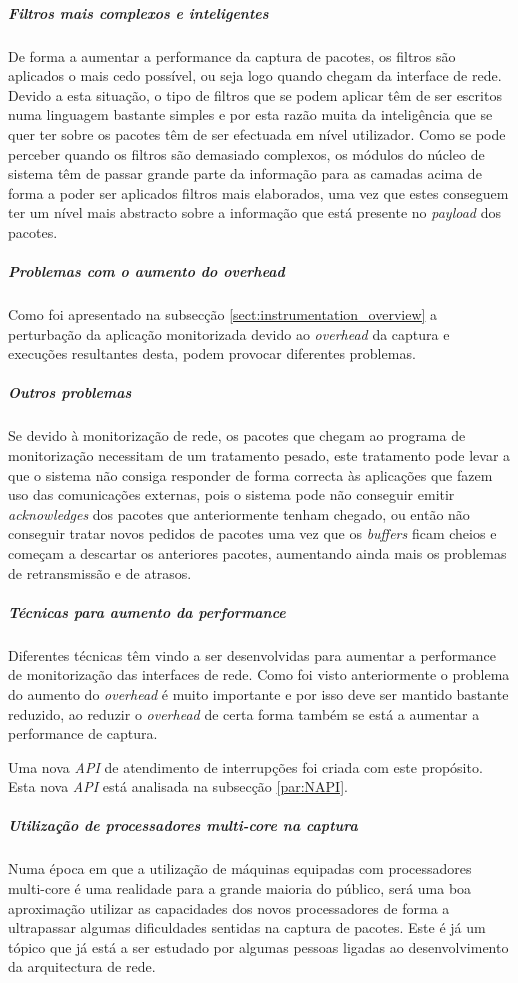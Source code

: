 \subparagraph*{Filtros mais complexos e inteligentes} De forma a aumentar a performance da captura de pacotes, os filtros são aplicados o mais cedo possível, ou seja logo quando chegam da interface de rede.
Devido a esta situação, o tipo de filtros que se podem aplicar têm de ser escritos numa linguagem bastante simples e por esta razão muita da inteligência que se quer ter sobre os pacotes têm de ser efectuada em nível utilizador.
Como se pode perceber quando os filtros são demasiado complexos, os módulos do núcleo de sistema têm de passar grande parte da informação para as camadas acima de forma a poder ser aplicados filtros mais elaborados, uma vez que estes conseguem ter um nível mais abstracto sobre a informação que está presente no \textit{payload} dos pacotes.

\subparagraph*{Problemas com o aumento do overhead}
Como foi apresentado na subsecção \ref{sect:instrumentation_overview} a perturbação da aplicação monitorizada devido ao \textit{overhead} da captura e execuções resultantes desta, podem provocar diferentes problemas.

\subparagraph*{Outros problemas
}
Se devido à monitorização de rede, os pacotes que chegam ao programa de monitorização necessitam de um tratamento pesado, este tratamento pode levar a que o sistema não consiga responder de forma correcta às aplicações que fazem uso das comunicações externas, pois o sistema pode não conseguir emitir \textit{acknowledges} dos pacotes que anteriormente tenham chegado, ou então não conseguir tratar novos pedidos de pacotes uma vez que os \textit{buffers} ficam cheios e começam a descartar os anteriores pacotes, aumentando ainda mais os problemas de retransmissão e de atrasos.

\subparagraph*{Técnicas para aumento da performance}
Diferentes técnicas têm vindo a ser desenvolvidas para aumentar a performance de monitorização das interfaces de rede.
Como foi visto anteriormente o problema do aumento do \textit{overhead} é muito importante e por isso deve ser mantido bastante reduzido, ao reduzir o \textit{overhead} de certa forma também se está a aumentar a performance de captura.

Uma nova \textit{API} de atendimento de interrupções foi criada com este propósito.
Esta nova \textit{API} está analisada na subsecção \ref{par:NAPI}.

\subparagraph*{Utilização de processadores \textit{multi-core} na captura}
Numa época em que a utilização de máquinas equipadas com processadores multi-core é uma realidade para a grande maioria do público, será uma boa aproximação utilizar as capacidades dos novos processadores de forma a ultrapassar algumas dificuldades sentidas na captura de pacotes.
Este é já um tópico que já está a ser estudado por algumas pessoas ligadas ao desenvolvimento da arquitectura de rede.


